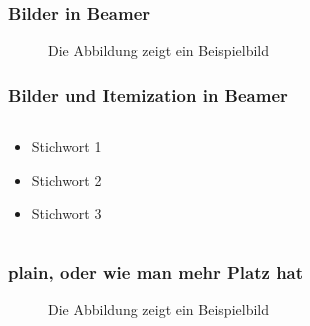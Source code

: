 \documentclass{beamer}
\begin{document}
\begin{frame}\frametitle{Bilder in Beamer}
\begin{figure}
\caption{Die Abbildung zeigt ein Beispielbild}
\end{figure}
\end{frame}



\begin{frame}
\frametitle{Bilder und Itemization in Beamer}
\begin{columns}
\begin{column}{5cm}
\begin{itemize}
\item<1-> Stichwort 1
\item<3-> Stichwort 2
\item<5-> Stichwort 3
\end{itemize}
\vspace{3cm} 
\end{column}
\begin{column}{5cm}
\begin{overprint}
\end{overprint}
\end{column}
\end{columns}
\end{frame}

\begin{frame}[plain]
\frametitle{plain, oder wie man mehr Platz hat}
\begin{figure}
\caption{Die Abbildung zeigt ein Beispielbild}
\end{figure}
\end{frame}
\end{document}
